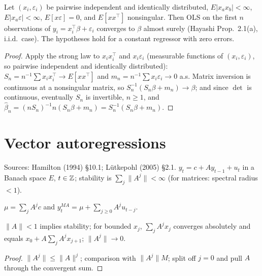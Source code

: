 \begin{theorem}
\label{thm:ols-consistent}
\leanok
{}
Let $(x_i,\varepsilon_i)$ be pairwise independent and identically distributed, $E|x_ax_b|<\infty$, $E|x_a\varepsilon|<\infty$,
$E[x\varepsilon] = 0$, and $E[xx^\top]$ nonsingular. Then OLS on the first $n$ observations of $y_i = x_i^\top\beta+\varepsilon_i$
converges to $\beta$ almost surely (Hayashi Prop.~2.1(a), i.i.d.\ case). The hypotheses hold for a constant regressor
with zero errors.
\end{theorem}
\begin{proof}
\leanok
Apply the strong law to $x_ix_i^\top$ and $x_i\varepsilon_i$ (measurable functions of $(x_i,\varepsilon_i)$, so pairwise
independent and identically distributed): $S_n = n^{-1}\sum x_ix_i^\top\to E[xx^\top]$ and
$m_n = n^{-1}\sum x_i\varepsilon_i\to0$ a.s. Matrix inversion is continuous at a nonsingular matrix, so
$S_n^{-1}(S_n\beta+m_n)\to\beta$; and since $\det$ is continuous, eventually $S_n$ is invertible, $n\ge1$, and
$\hat\beta_n = (nS_n)^{-1}n(S_n\beta+m_n) = S_n^{-1}(S_n\beta+m_n)$.
\end{proof}

\section{Vector autoregressions}
\label{sec:var}

Sources: Hamilton (1994) \S10.1; L\"utkepohl (2005) \S2.1. $y_t = c + Ay_{t-1}+u_t$ in a Banach space $E$, $t\in\mathbb{Z}$;
stability is $\sum_j\|A^j\|<\infty$ (for matrices: spectral radius $<1$).

\begin{definition}
\label{def:var}
\leanok
$\mu = \sum_jA^jc$ and $y^{MA}_t = \mu + \sum_{j\ge0}A^ju_{t-j}$.
\end{definition}

\begin{lemma}[Summability]
\label{lem:var-summable}
\leanok
{}
$\|A\|<1$ implies stability; for bounded $x_j$, $\sum_jA^jx_j$ converges absolutely and equals
$x_0 + A\sum_jA^jx_{j+1}$; $\|A^j\|\to0$.
\end{lemma}
\begin{proof}
\leanok
$\|A^j\|\le\|A\|^j$; comparison with $\|A^j\|M$; split off $j = 0$ and pull $A$ through the convergent sum.
\end{proof}

